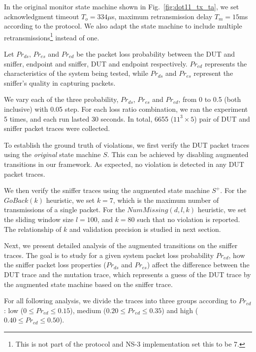 In the original monitor state machine shown in Fig.~\ref{fig:dot11_tx_ta}, we
set acknowledgment timeout $T_o=334\mu$s, maximum retransmission delay
$T_m=15$ms according to the protocol. We also adapt the state machine to include
multiple retransmissions\footnote{This is not part of the protocol and NS-3
implementation set this to be 7.} instead of one.

Let $Pr_{ds}$, $Pr_{es}$ and $Pr_{ed}$ be the packet loss probability between
the DUT and sniffer, endpoint and sniffer, DUT and endpoint respectively.
$Pr_{ed}$ represents the characteristics of the system being tested, while
$Pr_{ds}$ and $Pr_{es}$ represent the sniffer's quality in capturing packets.



We vary each of the three probability, $Pr_{ds}$, $Pr_{es}$ and $Pr_{ed}$, from
0 to 0.5 (both inclusive) with 0.05 step.  For each loss ratio combination, we
ran the experiment 5 times, and each run lasted
30 seconds. In total, 6655 ($11^3\times 5$) pair of DUT and sniffer packet
traces were collected.

To establish the ground truth of violations, we first verify the DUT packet
traces using the \textit{original} state machine $S$.  This can be achieved by
disabling augmented transitions in our framework.  As expected, no violation is
detected in any DUT packet traces.

We then verify the sniffer traces using the augmented state machine $S^+$.  For
the $GoBack(k)$ heuristic, we set $k=7$, which is the maximum number of
transmissions of a single packet. For the $NumMissing(d, l, k)$ heuristic, we
set the sliding window size $l=100$, and $k=80$ such that no violation is
reported. The relationship of $k$ and validation precision is studied in next
section.

Next, we present detailed analysis of the augmented transitions on the sniffer
traces. The goal is to study for a given system packet loss probability
$Pr_{ed}$, how the sniffer packet loss properties ($Pr_{ds}$ and $Pr_{es}$)
affect the difference between the DUT trace and the mutation trace, which represents
a guess of the DUT trace by the augmented state machine based on the sniffer
trace.

For all following analysis, we divide the traces into three groups according to
$Pr_{ed}$: low ($0 \le Pr_{ed} \le 0.15$), medium ($0.20 \le Pr_{ed} \le 0.35$)
and high ($0.40 \le Pr_{ed} \le 0.50$).

